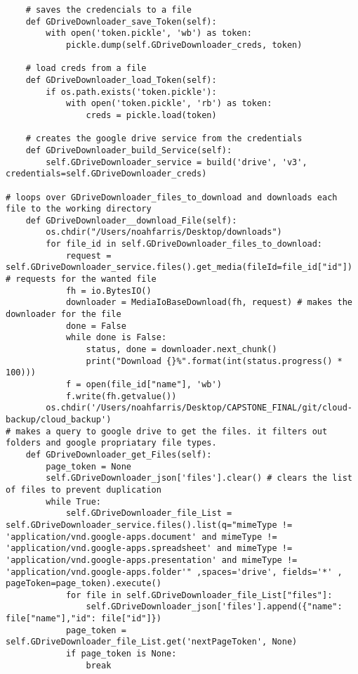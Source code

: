 \documentclass{article}
\begin{document}
\begin{verbatim}
    # saves the credencials to a file
    def GDriveDownloader_save_Token(self):
        with open('token.pickle', 'wb') as token:
            pickle.dump(self.GDriveDownloader_creds, token)

    # load creds from a file
    def GDriveDownloader_load_Token(self):
        if os.path.exists('token.pickle'):
            with open('token.pickle', 'rb') as token:
                creds = pickle.load(token)

    # creates the google drive service from the credentials
    def GDriveDownloader_build_Service(self):
        self.GDriveDownloader_service = build('drive', 'v3', credentials=self.GDriveDownloader_creds)

# loops over GDriveDownloader_files_to_download and downloads each file to the working directory 
    def GDriveDownloader__download_File(self):
        os.chdir("/Users/noahfarris/Desktop/downloads")
        for file_id in self.GDriveDownloader_files_to_download:
            request = self.GDriveDownloader_service.files().get_media(fileId=file_id["id"]) # requests for the wanted file
            fh = io.BytesIO()
            downloader = MediaIoBaseDownload(fh, request) # makes the downloader for the file
            done = False
            while done is False:
                status, done = downloader.next_chunk()
                print("Download {}%".format(int(status.progress() * 100)))
            f = open(file_id["name"], 'wb')
            f.write(fh.getvalue())
        os.chdir('/Users/noahfarris/Desktop/CAPSTONE_FINAL/git/cloud-backup/cloud_backup')
# makes a query to google drive to get the files. it filters out folders and google propriatary file types.
    def GDriveDownloader_get_Files(self):
        page_token = None 
        self.GDriveDownloader_json['files'].clear() # clears the list of files to prevent duplication
        while True:
            self.GDriveDownloader_file_List = self.GDriveDownloader_service.files().list(q="mimeType != 'application/vnd.google-apps.document' and mimeType != 'application/vnd.google-apps.spreadsheet' and mimeType != 'application/vnd.google-apps.presentation' and mimeType != 'application/vnd.google-apps.folder'" ,spaces='drive', fields='*' , pageToken=page_token).execute()
            for file in self.GDriveDownloader_file_List["files"]:
                self.GDriveDownloader_json['files'].append({"name": file["name"],"id": file["id"]})
            page_token = self.GDriveDownloader_file_List.get('nextPageToken', None)
            if page_token is None:
                break



\end{verbatim}
\end{document}
